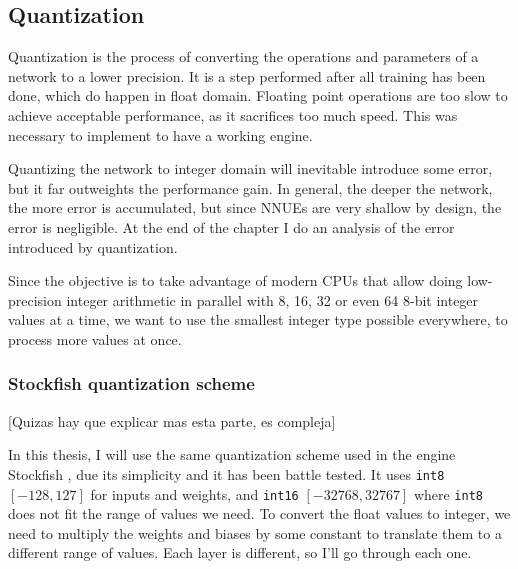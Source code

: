 \subsection{Quantization}


Quantization is the process of converting the operations and parameters of a network to a lower precision. It is a step performed after all training has been done, which do happen in float domain. Floating point operations are too slow to achieve acceptable performance, as it sacrifices too much speed. This was necessary to implement to have a working engine.

Quantizing the network to integer domain will inevitable introduce some error, but it far outweights the performance gain. In general, the deeper the network, the more error is accumulated, but since NNUEs are very shallow by design, the error is negligible. At the end of the chapter I do an analysis of the error introduced by quantization.

Since the objective is to take advantage of modern CPUs that allow doing low-precision integer arithmetic in parallel with 8, 16, 32 or even 64 8-bit integer values at a time, we want to use the smallest integer type possible everywhere, to process more values at once.

\subsubsection{Stockfish quantization scheme}

[Quizas hay que explicar mas esta parte, es compleja]

\def\int#1{\texttt{int#1}}

In this thesis, I will use the same quantization scheme used in the engine Stockfish \cite{nnue-pytorch}, due its simplicity and it has been battle tested. It uses \int{8} $[-128, 127]$ for inputs and weights, and \int{16} $[-32768, 32767]$ where \int{8} does not fit the range of values we need.
To convert the float values to integer, we need to multiply the weights and biases by some constant to translate them to a different range of values. Each layer is different, so I'll go through each one.


